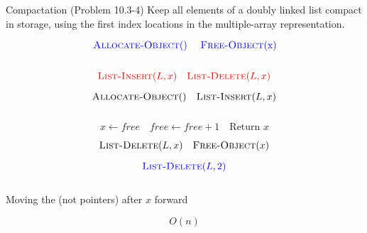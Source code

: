 
\begin{frame}{}
  \begin{exampleblock}{Compactation (Problem 10.3-4)}
    Keep all elements of a doubly linked list compact in storage,
    using the first  index locations in the multiple-array representation.

    \[
      \textcolor{blue}{\text{\textsc{Allocate-Object}() \quad \textsc{Free-Object}(x)}}
    \]
  \end{exampleblock}

  \vspace{0.30cm}
  \begin{columns}
      \pause
  \end{columns}

  \pause
  \vspace{0.50cm}
  \[
    \textcolor{red}{{\textsc{List-Insert}(L, x)} \quad \textsc{List-Delete}(L, x)}
  \]
\end{frame}

\begin{frame}{}
  \[
    \textsc{Allocate-Object}() \quad \textsc{List-Insert}(L, x)
  \]

  \begin{columns}
      \pause
      
      \pause
      
      \pause
      
  \end{columns}

  \pause
  \vspace{0.50cm}
  \[
    x \gets free \quad free \gets free + 1 \quad \text{Return } x
  \]
\end{frame}

\begin{frame}{}
  \[
    \textsc{List-Delete}(L, x) \quad \textsc{Free-Object}(x)
  \]

  \pause 
  \[
    \textcolor{blue}{\textsc{List-Delete}(L, 2)}
  \]

  \begin{columns}
      
      \pause
      
  \end{columns}

  \pause
  \begin{center}
    Moving the  (not pointers) after $x$ forward
  \end{center}
  \[
    O(n)
  \]
\end{frame}

